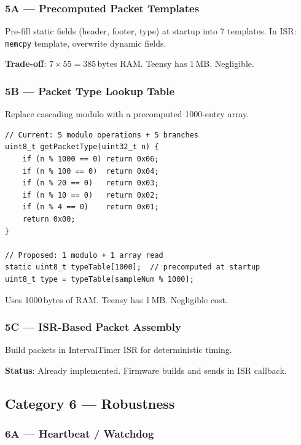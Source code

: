 \documentclass[11pt,a4paper]{article}
\begin{document}
\subsubsection{5A --- Precomputed Packet Templates}

Pre-fill static fields (header, footer, type) at startup into 7 templates. In ISR: \texttt{memcpy} template, overwrite dynamic fields.

\textbf{Trade-off}: $7 \times 55 = 385$\,bytes RAM. Teensy has 1\,MB. Negligible.

\subsubsection{5B --- Packet Type Lookup Table}

Replace cascading modulo with a precomputed 1000-entry array.

\begin{lstlisting}[style=cpp, caption={Packet type lookup table}]
// Current: 5 modulo operations + 5 branches
uint8_t getPacketType(uint32_t n) {
    if (n % 1000 == 0) return 0x06;
    if (n % 100 == 0)  return 0x04;
    if (n % 20 == 0)   return 0x03;
    if (n % 10 == 0)   return 0x02;
    if (n % 4 == 0)    return 0x01;
    return 0x00;
}

// Proposed: 1 modulo + 1 array read
static uint8_t typeTable[1000];  // precomputed at startup
uint8_t type = typeTable[sampleNum % 1000];
\end{lstlisting}

Uses 1000\,bytes of RAM. Teensy has 1\,MB. Negligible cost.

\subsubsection{5C --- ISR-Based Packet Assembly}

Build packets in IntervalTimer ISR for deterministic timing.

\textbf{Status}: Already implemented. Firmware builds and sends in ISR callback.

\subsection{Category 6 --- Robustness}

\subsubsection{6A --- Heartbeat / Watchdog}
\end{document}

